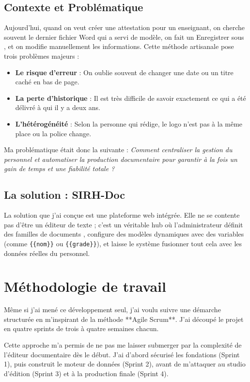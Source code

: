 \subsection{Contexte et Problématique}

Aujourd'hui, quand on veut créer une attestation pour un enseignant, on cherche souvent le dernier fichier Word qui a servi de modèle, on fait un \og Enregistrer sous \fg{}, et on modifie manuellement les informations. Cette méthode artisanale pose trois problèmes majeurs :
\begin{itemize}
    \item \textbf{Le risque d'erreur} : On oublie souvent de changer une date ou un titre caché en bas de page.
    \item \textbf{La perte d'historique} : Il est très difficile de savoir exactement ce qui a été délivré à qui il y a deux ans.
    \item \textbf{L'hétérogénéité} : Selon la personne qui rédige, le logo n'est pas à la même place ou la police change.
\end{itemize}

Ma problématique était donc la suivante : \textit{Comment centraliser la gestion du personnel et automatiser la production documentaire pour garantir à la fois un gain de temps et une fiabilité totale ?}

\subsection{La solution : SIRH-Doc}

La solution que j'ai conçue est une plateforme web intégrée. Elle ne se contente pas d'être un éditeur de texte ; c'est un véritable hub où l'administrateur définit des \og familles de documents \fg{}, configure des modèles dynamiques avec des variables (comme \texttt{\{\{nom\}\}} ou \texttt{\{\{grade\}\}}), et laisse le système fusionner tout cela avec les données réelles du personnel.

\section{Méthodologie de travail}

Même si j'ai mené ce développement seul, j'ai voulu suivre une démarche structurée en m'inspirant de la méthode **Agile Scrum**. J'ai découpé le projet en quatre sprints de trois à quatre semaines chacun. 

Cette approche m'a permis de ne pas me laisser submerger par la complexité de l'éditeur documentaire dès le début. J'ai d'abord sécurisé les fondations (Sprint 1), puis construit le moteur de données (Sprint 2), avant de m'attaquer au studio d'édition (Sprint 3) et à la production finale (Sprint 4).

